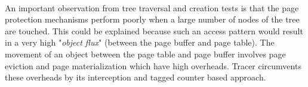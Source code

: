 \paragraph{}
An important observation from tree traversal and creation tests is that the page protection mechanisms perform poorly when a large number of nodes of the tree are touched. This could be explained because such an access pattern would result in a very high "{\emph{object flux}}" (between the page buffer and page table). The movement of an object between the page table and page buffer involves page eviction and page materialization which have high overheads. Tracer circumvents these overheads by its interception and tagged counter based approach. 

